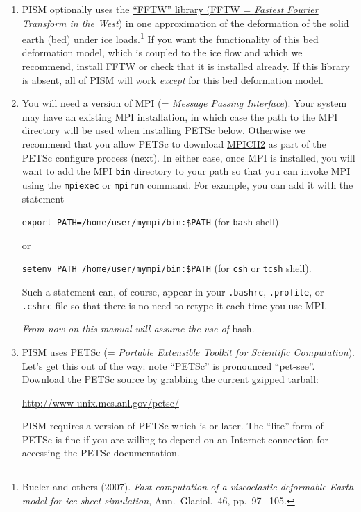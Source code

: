 \documentclass[titlepage,letterpaper,final]{scrartcl}
\begin{document}
\begin{enumerate}
\item PISM optionally uses the \href{http://www.fftw.org/}{``FFTW'' library
    (FFTW = \emph{Fastest Fourier Transform in the West})} in one approximation of the
  deformation of the solid earth (bed) under ice loads.\footnote{Bueler and
    others (2007). \emph{Fast computation of a viscoelastic deformable Earth
      model for ice sheet simulation}, Ann.~Glaciol.~46, pp.~97–-105.} If you
  want the functionality of this bed deformation model, which is coupled to the
  ice flow and which we recommend, install FFTW or check that it is installed
  already. If this library is absent, all of PISM will work \emph{except} for
  this bed deformation model.

\item You will need a version of \href{http://www-unix.mcs.anl.gov/mpi/}{MPI (=
    \emph{Message Passing Interface})}. Your system may have an existing MPI installation, in which
  case the path to the MPI directory will be used when installing PETSc below.
  Otherwise we recommend that you allow PETSc to download
  \href{http://www-unix.mcs.anl.gov/mpi/mpich2/}{MPICH2} as part of the PETSc
  configure process (next). In either case, once MPI is installed, you will
  want to add the MPI \texttt{bin} directory to your path so that you can
  invoke MPI using the \texttt{mpiexec} or \texttt{mpirun} command. For
  example, you can add it with the statement

\texttt{export PATH=/home/user/mympi/bin:\$PATH}  \qquad (for \texttt{bash} shell)

\noindent or

\texttt{setenv PATH /home/user/mympi/bin:\$PATH}  \qquad (for \texttt{csh} or \texttt{tcsh} shell).

\noindent Such a statement can, of course, appear in your \texttt{.bashrc},
\texttt{.profile}, or \texttt{.cshrc} file so that there is no need to retype
it each time you use MPI.

\medskip
\begin{center}
  \emph{From now on this manual will assume the use of} bash.
\end{center}
\medskip

\item PISM uses \href{http://www-unix.mcs.anl.gov/petsc/}{PETSc (=
    \emph{Portable Extensible Toolkit for Scientific
      Computation})}. Let's get this out of the way: note ``PETSc''
  is pronounced ``pet-see''. Download the PETSc source by grabbing the current
  gzipped tarball:
\begin{center}
    \url{http://www-unix.mcs.anl.gov/petsc/}
\end{center}
PISM requires a version of PETSc which is \texttt{\PETSCREL} or later. The
``lite'' form of PETSc is fine if you are willing to depend on an Internet
connection for accessing the PETSc documentation.


\end{enumerate}
\end{document}
